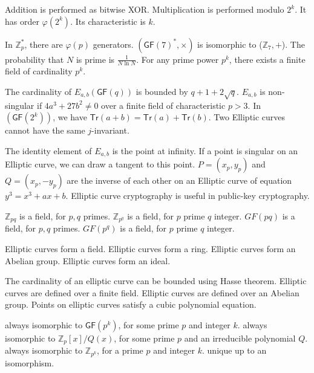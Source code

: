  {Addition is performed as bitwise XOR.}
 {Multiplication is performed modulo $2^k$.}
 {It has order $\varphi(2^k)$.}
 {Its characteristic is $k$.}
 
 {In $\mathbb{Z}_p^*$, there are $\varphi(p)$ generators.}
 {$(\mathsf{GF}(7)^*, \times)$ is isomorphic to ($\mathbb{Z}_7,+$).}
 {The probability that $N$ is prime is $\frac{1}{N\ln N}$.}
 {For any prime power $p^k$, there exists a finite field of cardinality $p^k$.}
 
 {The cardinality of $E_{a,b}(\mathsf{GF}(q))$ is bounded by $q+1+2\sqrt{q}$.}
 {$E_{a,b}$ is non-singular if $4a^3+27b^2 \neq 0$ over a finite field of characteristic $p>3$.}
 {In $(\mathsf{GF}(2^k))$, we have $\mathsf{Tr}(a+b)=\mathsf{Tr}(a)+\mathsf{Tr}(b)$.}
 {Two Elliptic curves cannot have the same $j$-invariant.}
 
 {The identity element of $E_{a,b}$ is the point at infinity.}
 {If a point is singular on an Elliptic curve, we can draw a tangent to this point.}
 { $P=(x_p,y_p)$ and $Q=(x_p,-y_p)$ are the inverse of each other on an Elliptic curve of equation $y^3=x^3+ax+b$.}
 {Elliptic curve cryptography is useful in public-key cryptography.}
 
{$\mathbb{Z}_{pq}$ is a field, for $p,q$ primes.}
{$\mathbb{Z}_{p^q}$ is a field, for $p$ prime $q$ integer.}
{$GF(pq)$ is a field, for $p,q$ primes.}
{$GF(p^q)$ is a field, for $p$ prime $q$ integer.}

 {Elliptic curves form a field.}
 {Elliptic curves form a ring.}
 {Elliptic curves form an Abelian group.}
 {Elliptic curves form an ideal.}
 
 {The cardinality of an elliptic curve can be bounded using Hasse theorem.}
 {Elliptic curves are defined over a finite field.}
 {Elliptic curves are defined over an Abelian group.}
 {Points on elliptic curves satisfy a cubic polynomial equation.}
 
 {always isomorphic to $\mathsf{GF}(p^k)$, for some prime $p$ and integer $k$.}
 {always isomorphic to $\mathbb{Z}_p[x]/Q(x)$, for some  prime $p$ and an irreducible polynomial $Q$.}
 {always isomorphic to $\mathbb{Z}_{p^k}$, for a prime $p$ and integer $k$.}
 {unique up to an isomorphism.}
 
